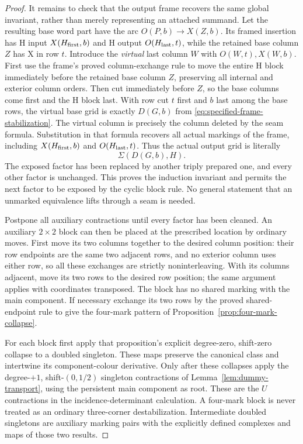 \documentclass[11pt,a4paper]{article}
\theoremstyle{remark}
\begin{document}
\begin{proof}
It remains to check that the output frame recovers the same global
invariant, rather than merely representing an attached summand.  Let
the resulting base word part have the arc
$O(P,b)\to X(Z,b)$.  Its framed insertion has H input
$X(H_{\rm first},b)$ and H output $O(H_{\rm last},t)$, while the
retained base column $Z$ has X in row $t$.  Introduce the
\emph{virtual} last column $W$ with $O(W,t),X(W,b)$.  First use the
frame's proved column-exchange rule to move the entire H block
immediately before the retained base column $Z$, preserving all
internal and exterior column orders.  Then cut immediately before
$Z$, so the base columns come first and the H block last.  With row
cut $t$ first and $b$ last among the base rows, the
virtual base grid is exactly $D(G,b)$ from
\eqref{eq:specified-frame-stabilization}.  The virtual column is
precisely the column deleted by the seam formula.  Substitution in
that formula recovers all actual markings of the frame, including
$X(H_{\rm first},b)$ and $O(H_{\rm last},t)$.  Thus the actual output
grid is literally
\[
 \Sigma(D(G,b),H).
\]
The exposed factor has been replaced by another triply prepared one,
and every other factor is unchanged.  This proves the induction
invariant and permits the next factor to be exposed by the cyclic
block rule.  No general statement that an unmarked equivalence lifts
through a seam is needed.

Postpone all auxiliary contractions until every factor has been
cleaned.  An auxiliary $2\times2$ block can then be placed at the
prescribed location by ordinary moves.  First move its two columns together
to the desired column position: their row endpoints are the same two
adjacent rows, and no exterior column uses either row, so all these
exchanges are strictly noninterleaving.  With its columns adjacent,
move its two rows to the desired row position; the same argument
applies with coordinates transposed.  The block has no shared marking
with the main component.  If necessary exchange its two rows by the
proved shared-endpoint rule to give the four-mark pattern of
Proposition~\ref{prop:four-mark-collapse}.

For each block first apply that proposition's explicit degree-zero,
shift-zero collapse to a doubled singleton.  These maps preserve the
canonical class and intertwine its component-colour derivative.  Only
after these collapses apply the degree-$+1$, shift-$(0,1/2)$ singleton
contractions of Lemma~\ref{lem:dummy-transport}, using the persistent
main component as root.  These are the $U$ contractions in the
incidence-determinant calculation.  A four-mark block is never
treated as an ordinary three-corner destabilization.  Intermediate
doubled singletons are auxiliary marking pairs with the explicitly
defined complexes and maps of those two results.


\end{proof}
\end{document}
